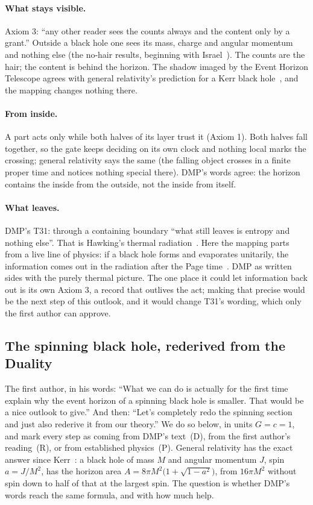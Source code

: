 \documentclass[11pt,a4paper]{article}
\theoremstyle{definition}
\theoremstyle{remark}
\begin{document}
\paragraph{What stays visible.} Axiom 3: ``any other reader sees the counts always and the content only by a grant.'' Outside a black
hole one sees its mass, charge and angular momentum and nothing else (the no-hair results, beginning with Israel~\cite{israel}). The
counts are the hair; the content is behind the horizon. The shadow imaged by the Event Horizon Telescope agrees with general relativity's
prediction for a Kerr black hole~\cite{eht}, and the mapping changes nothing there.

\paragraph{From inside.} A part acts only while both halves of its layer trust it (Axiom 1). Both halves fall together, so the gate keeps
deciding on its own clock and nothing local marks the crossing; general relativity says the same (the falling object crosses in a finite
proper time and notices nothing special there). DMP's words agree: the horizon contains the inside from the outside, not the inside from
itself.

\paragraph{What leaves.} DMP's T31: through a containing boundary ``what still leaves is entropy and nothing else''. That is Hawking's
thermal radiation~\cite{hawking}. Here the mapping parts from a live line of physics: if a black hole forms and evaporates unitarily, the
information comes out in the radiation after the Page time~\cite{page}. DMP as written sides with the purely thermal picture. The one
place it could let information back out is its own Axiom 3, a record that outlives the act; making that precise would be the next step of
this outlook, and it would change T31's wording, which only the first author can approve.

\subsection{The spinning black hole, rederived from the Duality}\label{sec:kerr}

\noindent The first author, in his words: ``What we can do is actually for the first time explain why the event horizon of a spinning
black hole is smaller. That would be a nice outlook to give.'' And then: ``Let's completely redo the spinning section and just also
rederive it from our theory.'' We do so below, in units $G=c=1$, and mark every step as coming from DMP's text~(D), from the first
author's reading~(R), or from established physics~(P). General relativity has the exact answer since Kerr~\cite{kerr}: a black hole of
mass $M$ and angular momentum $J$, spin $a=J/M^2$, has the horizon area $A=8\pi M^2\bigl(1+\sqrt{1-a^2}\bigr)$, from $16\pi M^2$ without
spin down to half of that at the largest spin. The question is whether DMP's words reach the same formula, and with how much help.
\end{document}
